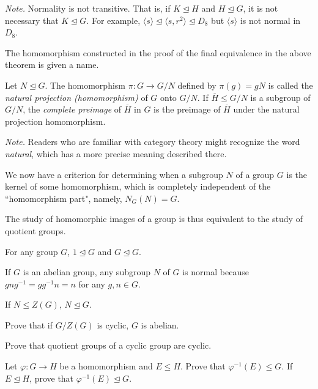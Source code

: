 \textit{Note.}  Normality is not transitive. That is, if $K\unlhd H$ and $H\unlhd G$, it is not necessary that $K\unlhd G$. For example, $\langle s \rangle \unlhd \langle s, r^2 \rangle \unlhd D_8$ but $\langle s\rangle$ is not normal in $D_8$.

\vspace{2mm}
The homomorphism constructed in the proof of the final equivalence in the above theorem is given a name.
\begin{definition}
    Let $N\unlhd G$. The homomorphism $\pi:G\to G/N$ defined by $\pi(g)=gN$ is called the \textit{natural projection (homomorphism)} of $G$ onto $G/N$. If $\overline H\leq G/N$ is a subgroup of $G/N$, the \textit{complete preimage} of $\overline H$ in $G$ is the preimage of $\overline H$ under the natural projection homomorphism.
\end{definition}

\textit{Note.} Readers who are familiar with category theory might recognize the word \textit{natural}, which has a more precise meaning described there.

\vspace{1mm}
We now have a criterion for determining when a subgroup $N$ of a group $G$ is the kernel of some homomorphism, which is completely independent of the ``homomorphism part", namely, $N_G(N)=G$.

\vspace{1mm}
The study of homomorphic images of a group is thus equivalent to the study of quotient groups.

\begin{example}
For any group $G$, $1\unlhd G$ and $G\unlhd G$.

If $G$ is an abelian group, any subgroup $N$ of $G$ is normal because $gng^{-1}=gg^{-1}n=n$ for any $g,n\in G$.

If $N\leq Z(G)$, $N\unlhd G$.
\end{example}

\begin{exercise}
    Prove that if $G/Z(G)$ is cyclic, $G$ is abelian.
\end{exercise}

\begin{exercise}
    Prove that quotient groups of a cyclic group are cyclic.
\end{exercise}

\begin{exercise}
\label{completePreimageIsSubgroup}
    Let $\varphi:G\to H$ be a homomorphism and $E\leq H$. Prove that $\varphi^{-1}(E)\leq G$. If $E\unlhd H$, prove that $\varphi^{-1}(E)\unlhd G$.
\end{exercise}

